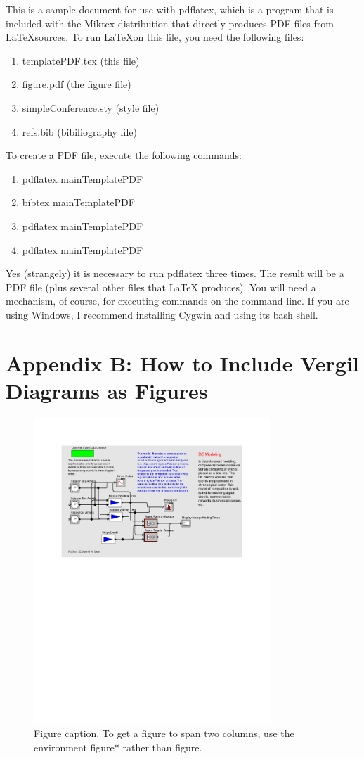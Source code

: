 \documentclass[10pt,twocolumn]{article}
\begin{document}
This is a sample document for use with pdflatex, which is
a program that is included with the Miktex distribution
that directly produces PDF files from \LaTeX sources.
To run \LaTeX on this file, you need the following files:
\begin{enumerate}
\item templatePDF.tex (this file)
\item figure.pdf (the figure file)
\item simpleConference.sty (style file)
\item refs.bib (bibiliography file)
\end{enumerate}
\noindent
To create a PDF file, execute the following commands:
\begin{enumerate}
\item pdflatex mainTemplatePDF
\item bibtex mainTemplatePDF
\item pdflatex mainTemplatePDF
\item pdflatex mainTemplatePDF
\end{enumerate}
\noindent
Yes (strangely) it is necessary to run pdflatex three times.
The result will be a PDF file (plus several other files that \LaTeX
produces).  You will need a mechanism, of course, for executing
commands on the command line. If you are using Windows, I recommend
installing Cygwin and using its bash shell.

\section{Appendix B: How to Include Vergil Diagrams as Figures}

\begin{figure}[!b]
  \begin{center}
    \includegraphics[width=3.5in]{figure.pdf}
  \end{center}

  \caption{\small Figure caption. To get a figure to span two
      columns, use the environment figure* rather than figure.}
  \label{fig-label}
\end{figure}
\end{document}
